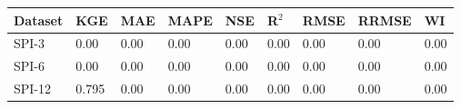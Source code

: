 \begin{tabular}{lllllllll}
\toprule
Dataset & KGE & MAE & MAPE & NSE & R$^2$ & RMSE & RRMSE & WI \\
\midrule
 SPI-3 & 0.00 & 0.00 & 0.00 & 0.00 & 0.00 & 0.00 & 0.00 & 0.00 \\
 SPI-6 & 0.00 & 0.00 & 0.00 & 0.00 & 0.00 & 0.00 & 0.00 & 0.00 \\
SPI-12 & 0.795 & 0.00 & 0.00 & 0.00 & 0.00 & 0.00 & 0.00 & 0.00 \\
\bottomrule
\end{tabular}
